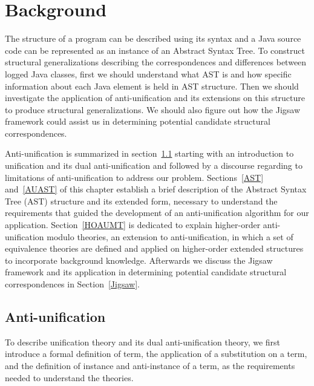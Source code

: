 \chapter{Background}  \label{background}
The structure of a program can be described using its syntax and a Java source code can be represented as an instance of an Abstract Syntax Tree. To construct structural generalizations describing the correspondences and differences between logged Java classes, first we should understand what AST is and how specific information about each Java element is held in AST structure. Then we should investigate the application of anti-unification and its extensions on this structure to produce structural generalizations. We should also figure out how the Jigsaw framework could assist us in determining potential candidate structural correspondences.

Anti-unification is summarized in section~\ref{AU} starting with an introduction to unification and its dual anti-unification and followed by a discourse regarding to limitations of anti-unification to address our problem. 
Sections~\ref{AST} and~\ref{AUAST} of this chapter establish a brief description of the Abstract Syntax Tree (AST) structure and its extended form, necessary to understand the requirements that guided the development of an anti-unification algorithm for our application.
Section~\ref{HOAUMT} is dedicated to explain higher-order anti-unification modulo theories, an extension to anti-unification, in which a set of equivalence theories are defined and applied on higher-order extended structures to incorporate background knowledge. 
Afterwards we discuss the Jigsaw framework and its application in determining potential candidate structural correspondences in Section~\ref{Jigsaw}.

\section{Anti-unification}   \label{AU}

To describe unification theory and its dual anti-unification theory, we first introduce a formal definition of term, the application of a substitution on a term, and the definition of instance and anti-instance of a term, as the requirements needed to understand the theories. 

